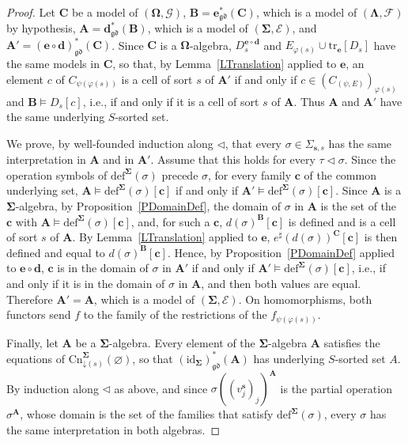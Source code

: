 \documentclass{amsart}
\newcommand{\vs}[1]{\mathbin{\downarrow}#1}
\theoremstyle{plain}
\theoremstyle{definition}
\begin{document}
\begin{proof}
Let $\mathbf{C}$ be a model of $(\mathbf{\Omega},\mathcal{G})$, $\mathbf{B}=\mathbf{e}^{\ast}_{\mathfrak{gd}}(\mathbf{C})$, which is a model of $(\mathbf{\Lambda},\mathcal{F})$ by hypothesis, $\mathbf{A}=\mathbf{d}^{\ast}_{\mathfrak{gd}}(\mathbf{B})$, which is a model of $(\mathbf{\Sigma},\mathcal{E})$, and $\mathbf{A}'=(\mathbf{e}\circ\mathbf{d})^{\ast}_{\mathfrak{gd}}(\mathbf{C})$. Since $\mathbf{C}$ is a $\mathbf{\Omega}$-algebra, $D^{\mathbf{e}\circ\mathbf{d}}_{s}$ and $E_{\varphi(s)}\cup\mathrm{tr}_{\mathbf{e}}[D_{s}]$ have the same models in $\mathbf{C}$, so that, by Lemma~\ref{LTranslation} applied to $\mathbf{e}$, an element $c$ of $C_{\psi(\varphi(s))}$ is a cell of sort $s$ of $\mathbf{A}'$ if and only if $c\in(C_{(\psi,E)})_{\varphi(s)}$ and $\mathbf{B}\models D_{s}[c]$, i.e., if and only if it is a cell of sort $s$ of $\mathbf{A}$. Thus $\mathbf{A}$ and $\mathbf{A}'$ have the same underlying $S$-sorted set.

We prove, by well-founded induction along $\lhd$, that every $\sigma\in\Sigma_{\mathbf{s},s}$ has the same interpretation in $\mathbf{A}$ and in $\mathbf{A}'$. Assume that this holds for every $\tau\lhd\sigma$. Since the operation symbols of $\mathrm{def}^{\mathbf{\Sigma}}(\sigma)$ precede $\sigma$, for every family $\mathbf{c}$ of the common underlying set, $\mathbf{A}\models\mathrm{def}^{\mathbf{\Sigma}}(\sigma)[\mathbf{c}]$ if and only if $\mathbf{A}'\models\mathrm{def}^{\mathbf{\Sigma}}(\sigma)[\mathbf{c}]$. Since $\mathbf{A}$ is a $\mathbf{\Sigma}$-algebra, by Proposition~\ref{PDomainDef}, the domain of $\sigma$ in $\mathbf{A}$ is the set of the $\mathbf{c}$ with $\mathbf{A}\models\mathrm{def}^{\mathbf{\Sigma}}(\sigma)[\mathbf{c}]$, and, for such a $\mathbf{c}$, $d(\sigma)^{\mathbf{B}}[\mathbf{c}]$ is defined and is a cell of sort $s$ of $\mathbf{A}$. By Lemma~\ref{LTranslation} applied to $\mathbf{e}$, $e^{\sharp}(d(\sigma))^{\mathbf{C}}[\mathbf{c}]$ is then defined and equal to $d(\sigma)^{\mathbf{B}}[\mathbf{c}]$. Hence, by Proposition~\ref{PDomainDef} applied to $\mathbf{e}\circ\mathbf{d}$, $\mathbf{c}$ is in the domain of $\sigma$ in $\mathbf{A}'$ if and only if $\mathbf{A}'\models\mathrm{def}^{\mathbf{\Sigma}}(\sigma)[\mathbf{c}]$, i.e., if and only if it is in the domain of $\sigma$ in $\mathbf{A}$, and then both values are equal. Therefore $\mathbf{A}'=\mathbf{A}$, which is a model of $(\mathbf{\Sigma},\mathcal{E})$. On homomorphisms, both functors send $f$ to the family of the restrictions of the $f_{\psi(\varphi(s))}$.

Finally, let $\mathbf{A}$ be a $\mathbf{\Sigma}$-algebra. Every element of the $\mathbf{\Sigma}$-algebra $\mathbf{A}$ satisfies the equations of $\mathrm{Cn}^{\mathbf{\Sigma}}_{\vs{(s)}}(\varnothing)$, so that $(\mathrm{id}_{\mathbf{\Sigma}})^{\ast}_{\mathfrak{gd}}(\mathbf{A})$ has underlying $S$-sorted set $A$. By induction along $\lhd$ as above, and since $\sigma((v^{\mathbf{s}}_{j})_{j})^{\mathbf{A}}$ is the partial operation $\sigma^{\mathbf{A}}$, whose domain is the set of the families that satisfy $\mathrm{def}^{\mathbf{\Sigma}}(\sigma)$, every $\sigma$ has the same interpretation in both algebras.
\end{proof}
\end{document}

